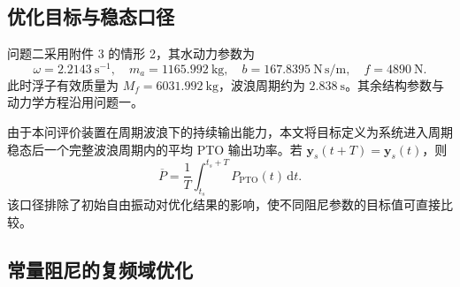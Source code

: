 \documentclass[withoutpreface]{../../../templates/CUMCM2026-Complete-LaTeX/cumcmthesis}
\begin{document}
\subsection{优化目标与稳态口径}

问题二采用附件 3 的情形 2，其水动力参数为
\begin{equation}
  \omega=2.2143\ \mathrm{s^{-1}},\quad
  m_a=1165.992\ \mathrm{kg},\quad
  b=167.8395\ \mathrm{N\,s/m},\quad
  f=4890\ \mathrm{N}.
  \label{eq:q2-parameters}
\end{equation}
此时浮子有效质量为 $M_f=6031.992\ \mathrm{kg}$，波浪周期约为 $2.838\ \mathrm{s}$。其余结构参数与动力学方程沿用问题一。

由于本问评价装置在周期波浪下的持续输出能力，本文将目标定义为系统进入周期稳态后一个完整波浪周期内的平均 PTO 输出功率。若 $\boldsymbol y_s(t+T)=\boldsymbol y_s(t)$，则
\begin{equation}
  \overline P=\frac{1}{T}\int_{t_s}^{t_s+T}P_{\mathrm{PTO}}(t)\,\mathrm{d}t.
  \label{eq:mean-power}
\end{equation}
该口径排除了初始自由振动对优化结果的影响，使不同阻尼参数的目标值可直接比较。

\subsection{常量阻尼的复频域优化}
\end{document}
